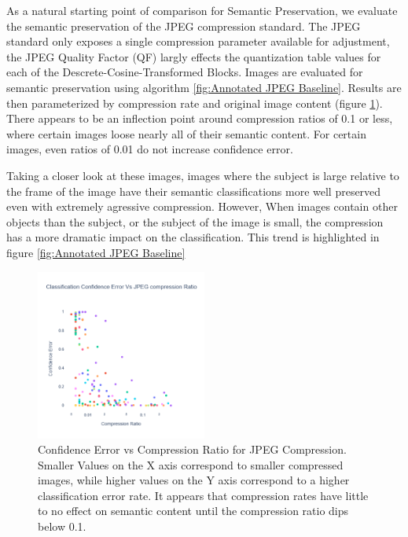 As a natural starting point of comparison for Semantic Preservation, we evaluate the semantic preservation of the JPEG compression standard.
The JPEG standard only exposes a single compression parameter available for adjustment, the JPEG Quality Factor (QF) largly effects the quantization table values for each of the Descrete-Cosine-Transformed Blocks.
Images are evaluated for semantic preservation using algorithm \ref{fig:Annotated JPEG Baseline}.
Results are then parameterized by compression rate and original image content (figure \ref{fig:Comp vs Ratio JPEG Baseline}). There appears to be an inflection point around compression ratios of 0.1 or less, where certain images loose nearly all of their semantic content. For certain images, even ratios of 0.01 do not increase confidence error.

Taking a closer look at these images, images where the subject is large relative to the frame of the image have their semantic classifications more well preserved even with extremely agressive compression. However, When images contain other objects than the subject, or the subject of the image is small, the compression has a more dramatic impact on the classification. This trend is highlighted in figure \ref{fig:Annotated JPEG Baseline}

\begin{figure}
    \includegraphics[width=0.5\textwidth]{assets/Baseline JPEG Confidence vs Comp Ratio.png}
    \caption{Confidence Error vs Compression Ratio for JPEG Compression. Smaller Values on the X axis correspond to smaller compressed images, while higher values on the Y axis correspond to a higher classification error rate. It appears that compression rates have little to no effect on semantic content until the compression ratio dips below 0.1.}
    \label{fig:Comp vs Ratio JPEG Baseline}
\end{figure}

